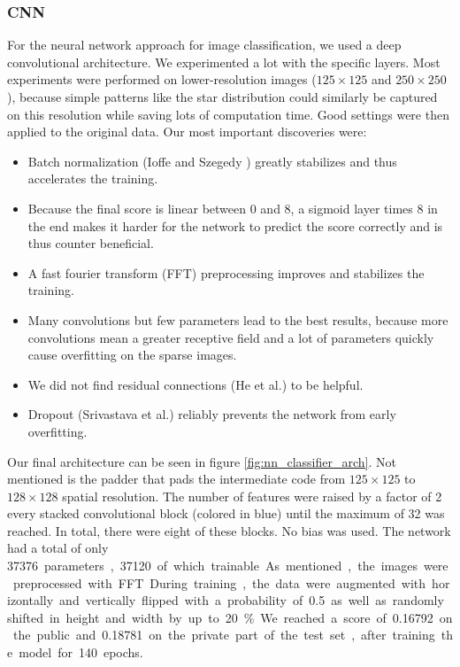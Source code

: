\documentclass[10pt,conference,compsocconf]{IEEEtran}
\begin{document}
\subsubsection{CNN} %
For the neural network approach for image classification, we used a deep convolutional architecture. We experimented a lot with the specific layers. Most experiments were performed on lower-resolution images ($125\times125$ and $250\times250$), because simple patterns like the star distribution could similarly be captured on this resolution while saving lots of computation time. Good settings were then applied to the original data. Our most important discoveries were:
\begin{itemize}
    \item Batch normalization (Ioffe and Szegedy \cite{BatchNorm}) greatly stabilizes and thus accelerates the training.
    \item Because the final score is linear between 0 and 8, a sigmoid layer times 8 in the end makes it harder for the network to predict the score correctly and is thus counter beneficial.
    \item A fast fourier transform (FFT) preprocessing improves and stabilizes the training.
    \item Many convolutions but few parameters lead to the best results, because more convolutions mean a greater receptive field and a lot of parameters quickly cause overfitting on the sparse images.
    \item We did not find residual connections (He et al.\@ \cite{ResNet}) to be helpful.
    \item Dropout (Srivastava et al.\@ \cite{Dropout}) reliably prevents the network from early overfitting.
\end{itemize}
Our final architecture can be seen in figure \ref{fig:nn_classifier_arch}.  Not mentioned is the padder that pads the intermediate code from $125\times125$ to $128\times128$ spatial resolution. The number of features were raised by a factor of 2 every stacked convolutional block (colored in blue) until the maximum of 32 was reached. In total, there were eight of these blocks. No bias was used. The network had a total of only \SI{37376} parameters, \SI{37120} of which trainable. As mentioned, the images were preprocessed with FFT. During training, the data were augmented with horizontally and vertically flipped with a probability of \SI{0.5} as well as randomly shifted in height and width by up to \SI{20}{\percent}. We reached a score of \SI{0.16792} on the public and \SI{0.18781} on the private part of the test set, after training the model for 140 epochs.
\end{document}
